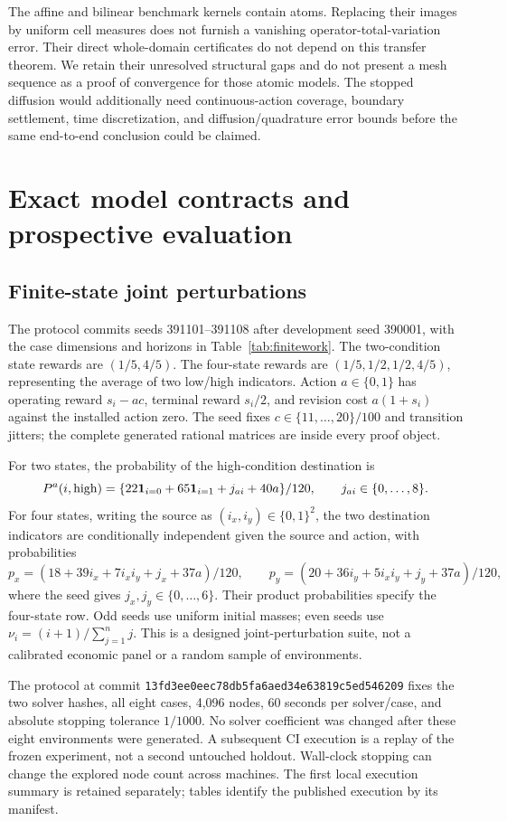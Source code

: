 The affine and bilinear benchmark kernels contain atoms. Replacing their images by uniform cell measures does not furnish a vanishing operator-total-variation error. Their direct whole-domain certificates do not depend on this transfer theorem. We retain their unresolved structural gaps and do not present a mesh sequence as a proof of convergence for those atomic models. The stopped diffusion would additionally need continuous-action coverage, boundary settlement, time discretization, and diffusion/quadrature error bounds before the same end-to-end conclusion could be claimed.

\section{Exact model contracts and prospective evaluation}
\subsection{Finite-state joint perturbations}
The protocol commits seeds 391101--391108 after development seed 390001, with the case dimensions and horizons in Table~\ref{tab:finitework}. The two-condition state rewards are $(1/5,4/5)$. The four-state rewards are $(1/5,1/2,1/2,4/5)$, representing the average of two low/high indicators. Action $a\in\{0,1\}$ has operating reward $s_i-a c$, terminal reward $s_i/2$, and revision cost $a(1+s_i)$ against the installed action zero. The seed fixes $c\in\{11,\ldots,20\}/100$ and transition jitters; the complete generated rational matrices are inside every proof object.

For two states, the probability of the high-condition destination is
\[
 P^a(i,\mathrm{high})=
 \{22\mathbf 1_{i=0}+65\mathbf 1_{i=1}+j_{ai}+40a\}/120,
 \qquad j_{ai}\in\{0,\ldots,8\}.
\]
For four states, writing the source as $(i_x,i_y)\in\{0,1\}^2$, the two destination indicators are conditionally independent given the source and action, with probabilities
\[
 p_x=(18+39i_x+7i_xi_y+j_x+37a)/120,\qquad
 p_y=(20+36i_y+5i_xi_y+j_y+37a)/120,
\]
where the seed gives $j_x,j_y\in\{0,\ldots,6\}$. Their product probabilities specify the four-state row. Odd seeds use uniform initial masses; even seeds use $\nu_i=(i+1)/\sum_{j=1}^n j$. This is a designed joint-perturbation suite, not a calibrated economic panel or a random sample of environments.

The protocol at commit \texttt{13fd3ee0eec78db5fa6aed34e63819c5ed546209} fixes the two solver hashes, all eight cases, 4,096 nodes, 60 seconds per solver/case, and absolute stopping tolerance $1/1000$. No solver coefficient was changed after these eight environments were generated. A subsequent CI execution is a replay of the frozen experiment, not a second untouched holdout. Wall-clock stopping can change the explored node count across machines. The first local execution summary is retained separately; tables identify the published execution by its manifest.

